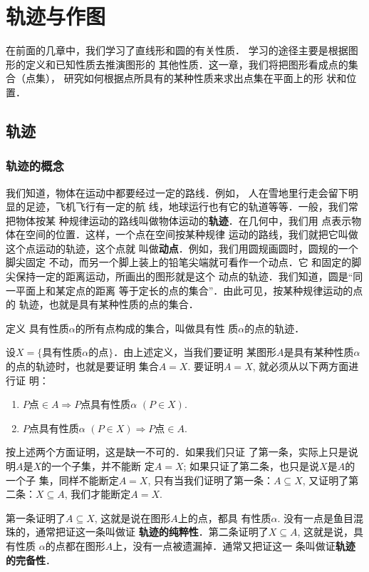 \chapter{轨迹与作图}
在前面的几章中，我们学习了直线形和圆的有关性质．
学习的途径主要是根据图形的定义和已知性质去推演图形的
其他性质．这一章，我们将把图形看成点的集合（点集），
研究如何根据点所具有的某种性质来求出点集在平面上的形
状和位置．

\section{轨迹}
\subsection{轨迹的概念}
我们知道，物体在运动中都要经过一定的路线．例如，
人在雪地里行走会留下明显的足迹，飞机飞行有一定的航
线，地球运行也有它的轨道等等．一般，我们常把物体按某
种规律运动的路线叫做物体运动的\textbf{轨迹}．在几何中，我们用
点表示物体在空间的位置．这样，一个点在空间按某种规律
运动的路线，我们就把它叫做这个点运动的轨迹，这个点就
叫做\textbf{动点}．例如，我们用圆规画圆时，圆规的一个脚尖固定
不动，而另一个脚上装上的铅笔尖端就可看作一个动点．它
和固定的脚尖保持一定的距离运动，所画出的图形就是这个
动点的轨迹．我们知道，圆是“同一平面上和某定点的距离
等于定长的点的集合”．由此可见，按某种规律运动的点的
轨迹，也就是具有某种性质的点的集合．

\begin{blk}{定义}
具有性质$\alpha$的所有点构成的集合，叫做具有性
质$\alpha$的点的轨迹．
\end{blk}

设$X=\{\text{具有性质$\alpha$的点}\}$．由上述定义，当我们要证明
某图形$A$是具有某种性质$\alpha$的点的轨迹时，也就是要证明
集合$A=X$. 要证明$A=X$, 就必须从以下两方面进行证
明：
\begin{enumerate}
\item $P$点$\in A\Rightarrow P$点具有性质$\alpha$ $(P\in X)$.
\item $P$点具有性质$\alpha$ $(P\in X)\Rightarrow P$点$\in A$.
\end{enumerate}

按上述两个方面证明，这是缺一不可的．如果我们只证
了第一条，实际上只是说明$A$是$X$的一个子集，并不能断
定$A=X$; 如果只证了第二条，也只是说$X$是$A$的一个子
集，同样不能断定$A=X$, 只有当我们证明了第一条：$A\subseteq
X$, 又证明了第二条：$X\subseteq A$, 我们才能断定$A=X$.

第一条证明了$A\subseteq X$, 这就是说在图形$A$上的点，都具
有性质$\alpha$. 没有一点是鱼目混珠的，通常把证这一条叫做证
\textbf{轨迹的纯粹性}．第二条证明了$X\subseteq A$, 这就是说，具有性质
$\alpha$的点都在图形$A$上，没有一点被遗漏掉．通常又把证这一
条叫做证\textbf{轨迹的完备性}．

